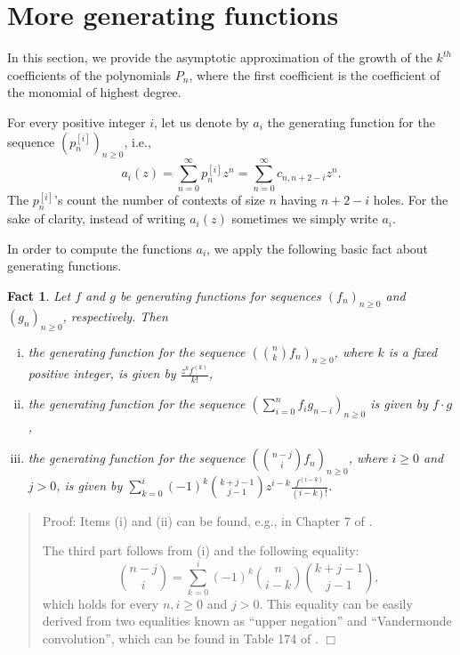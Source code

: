 \documentclass{jfp1}
\newenvironment{proof}[1]{\begin{quotation}\noindent\textsf{Proof:} #1}
{\(\Box\)\end{quotation}}
\newtheorem{fact}[theo]{Fact}
\newcommand{\ie}{i.e.,~}
\newcommand{\p}[2]{p^{[#1]}_{#2}}
\begin{document}
\section{More generating functions}
\label{sec:generating}

In this section, we provide the asymptotic approximation of the growth of the
$k^{th}$ coefficients of the polynomials $P_n$, where the first coefficient is the
coefficient of the monomial of highest degree.

For every positive integer $i$, let us denote by $a_i$ the generating function for the sequence $\left( \p{i}{n} \right)_{n \geq 0}$, \ie
\[ a_i(z) = \sum_{n=0}^{\infty} \p{i}{n} z^n = \sum_{n=0}^{\infty} c_{n,n+2-i} z^n .\] The
$\p{i}{n}$'s count the number of contexts of size $n$ having $n+2-i$ holes. For the sake of clarity, instead of writing $a_i(z)$ sometimes we simply write
$a_i$.

In order to compute the functions $a_i$, we apply the following basic fact about generating functions.

\begin{fact}\label{basicGen}
Let $f$ and $g$ be generating functions for sequences $\left( f_n \right)_{n \geq 0}$ and $\left( g_n \right)_{n \geq 0}$, respectively. Then
\begin{enumerate}[(i)]
\item the generating function for the sequence $\left( {n \choose k}f_n \right)_{n \geq 0}$, where $k$ is a fixed positive integer, is given by $\frac{z^k f^{(k)}}{k!}$,
\item the generating function for the sequence $\left( \sum_{i=0}^n f_i g_{n-i} \right)_{n \geq 0}$ is given by $f \cdot g$,
\item the generating function for the sequence $\left( {n-j \choose i} f_n \right)_{n \geq 0}$, where $i \geq 0$ and $j > 0$, is given by $\sum_{k=0}^{i} (-1)^k {k+j-1 \choose j-1}z^{i-k} \frac{f^{(i-k)}}{(i-k)!}$.
\end{enumerate}
\end{fact}

\begin{proof}
Items (i) and (ii) can be found, e.g., in Chapter 7 of \cite{GraKnuPat}.

The third part follows from (i) and the following equality:
\[{n-j \choose i} = \sum_{k=0}^{i} (-1)^k {n \choose i-k} {k+j-1 \choose j-1},\]
which holds for every $n,i \geq 0$ and $j > 0$. This equality can be easily derived from
two equalities known as ``upper negation'' and ``Vandermonde convolution'', which can be
found in Table 174 of \cite{GraKnuPat}.
\end{proof}
\end{document}
